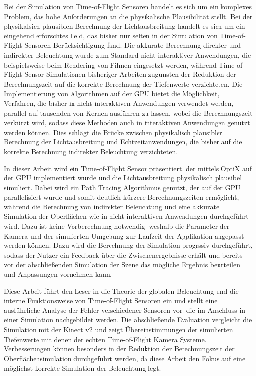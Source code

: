 \documentclass[thesis.tex]{subfiles}
\begin{document}

Bei der Simulation von Time-of-Flight Sensoren handelt es sich um ein komplexes Problem, das hohe Anforderungen an die physikalische Plausibilität stellt. Bei der physikalsich plausiblen Berechnung der Lichtausbreitung handelt es sich um ein eingehend erforschtes Feld, das bisher nur selten in der Simulation von Time-of-Flight Sensoren Berücksichtigung fand. Die akkurate Berechnung direkter und indirekter Beleuchtung wurde zum Standard nicht-interaktiver Anwendungen, die beispielsweise beim Rendering von Filmen eingesetzt werden, während Time-of-Flight Sensor Simulationen bisheriger Arbeiten zugunsten der Reduktion der Berechnungszeit auf die korrekte Berechnung der Tiefenwerte verzichteten. Die Implementierung von Algorithmen auf der GPU bietet die Möglichkeit, Verfahren, die bisher in nicht-interaktiven Anwendungen verwendet werden, parallel auf tausenden von Kernen ausführen zu lassen, wobei die Berechnungszeit verkürzt wird, sodass diese Methoden auch in interaktiven Anwendungen genutzt werden können. Dies schlägt die Brücke zwischen physikalisch plausibler Berechnung der Lichtausbreitung und Echtzeitanwendungen, die bisher auf die korrekte Berechnung indirekter Beleuchtung verzichteten.

In dieser Arbeit wird ein Time-of-Flight Sensor präsentiert, der mittels OptiX auf der GPU implementiert wurde und die Lichtausbreitung physikalisch plausibel simuliert. Dabei wird ein Path Tracing Algorithmus genutzt, der auf der GPU parallelisiert wurde und somit deutlich kürzere Berechnungszeiten ermöglicht, während die Berechnung von indirekter Beleuchtung und eine akkurate Simulation der Oberflächen wie in nicht-interaktiven Anwendungen durchgeführt wird. Dazu ist keine Vorberechnung notwendig, weshalb die Parameter der Kamera und der simulierten Umgebung zur Laufzeit der Applikation angepasst werden können. Dazu wird die Berechnung der Simulation progrssiv durchgeführt, sodass der Nutzer ein Feedback über die Zwischenergebnisse erhält und bereits vor der abschließenden Simulation der Szene das mögliche Ergebnis beurteilen und Anpassungen vornehmen kann.

Diese Arbeit führt den Leser in die Theorie der globalen Beleuchtung und die interne Funktionsweise von Time-of-Flight Sensoren ein und stellt eine ausführliche Analyse der Fehler verschiedener Sensoren vor, die im Anschluss in einer Simulation nachgebildet werden. Die abschließende Evaluation vergleicht die Simulation mit der Kinect v2 und zeigt Übereinstimmungen der simulierten Tiefenwerte mit denen der echten Time-of-Flight Kamera Systeme. Verbesserungen können besonders in der Reduktion der Berechnungszeit der Oberflächensimulation durchgeführt werden, da diese Arbeit den Fokus auf eine möglichst korrekte Simulation der Beleuchtung legt.
\end{document}
